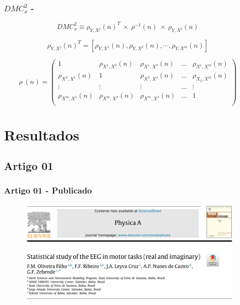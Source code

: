 \documentclass[11pt, aspectratio=169]{beamer}
\newcommand{\dmc}{\(DMC_x^2\) }
\begin{document}
\begin{frame}
  \frametitle{\dmc - \cite{Zebende2018}}

  \begin{equation}
  {DMC}_{x}^{2}  \equiv \rho_{Y,X^{j}}(n)^{T} ~\times ~ \rho^{-1}(n) ~\times ~\rho_{Y,X^{j}}(n)
  \label{eq:dmc}
\end{equation}

\begin{equation} \label{eq:rho_vec_col}
  \rho_{Y,X^{j}}(n)^T=[\rho_{Y,X^1}(n), \rho_{Y,X^2}(n),\cdots,\rho_{Y,X^m}(n)]
\end{equation}

\begin{equation}
  \rho~(n) = \left(\begin{matrix}
    1                     & \rho_{X^{1},X^{2}}(n) & \rho_{X^{1},X^{3}}(n) & \dots & \rho_{X^{1},X^{m}}(n) \\
    \rho_{X^{2},X^{1}}(n) & 1                     & \rho_{X^{2},X^{3}}(n) & \dots & \rho_{X_{2},X^{m}}(n) \\
    \vdots                & \vdots                & \vdots                & \dots & \vdots                \\
    \rho_{X^{m},X^{1}}(n) & \rho_{X^{m},X^{2}}(n) & \rho_{X^{m},X^{3}}(n) & \dots & 1                     \\
  \end{matrix}\right)
  \label{eq:p_dcca_matrix}
\end{equation}

\end{frame}



\section{Resultados}

\subsection{Artigo 01}

\begin{frame}
  \frametitle{Artigo 01 - Publicado}

  \begin{figure}[!htb]
    \centering
    \caption{\cite{Oliveira2023}}
    \includegraphics[height=.6\paperheight]{../Figures/artigos_publicados/artigo_01_abr_2023.png}
    \label{fig:ar_pub_01}
  \end{figure}

\end{frame}
\end{document}
